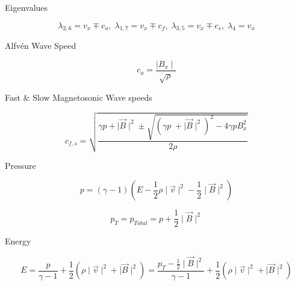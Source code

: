 
Eigenvalues

\begin{equation}
    \lambda_{2,6} = v_x \mp c_a, \;
    \lambda_{1,7} = v_x \mp c_f, \;
    \lambda_{3,5} = v_x \mp c_s, \;
    \lambda_{4} = v_x
\end{equation}

Alfv\'en Wave Speed

\begin{equation}
    c_a = \frac{\mid B_x \mid}{\sqrt{\rho}}
\end{equation}

Fast \& Slow Magnetosonic Wave speeds

\begin{equation}
    c_{f,s} = \sqrt{\frac
    {\gamma p + \mid \vec{B} \mid^2 \pm \sqrt{\left( \gamma p \;+ \mid \vec{B} \mid^2 \right)^2 - 4\gamma p B_x^2 } }
    {2\rho}}
\end{equation}

Pressure

\begin{equation}
    p = \left( \gamma - 1 \right)
        \left( E - \frac{1}{2} \rho \mid \vec{v}\mid ^2 - \frac{1}{2} \mid \vec{B} \mid ^2 \right)
\end{equation}

\begin{equation}
    p_T = p_{Total} = p + \frac{1}{2} \mid \vec{B} \mid ^2
\end{equation}

Energy

\begin{equation}
    E = \frac{p}{\gamma - 1} + \frac{1}{2}\left( \rho \mid \vec{v} \mid ^2 + \mid \vec{B} \mid ^2\right)
      = \frac{p_T - \frac{1}{2}\mid \vec{B} \mid^2 }{\gamma - 1} + \frac{1}{2}\left( \rho \mid \vec{v} \mid ^2 + \mid \vec{B} \mid ^2\right)
\end{equation}
